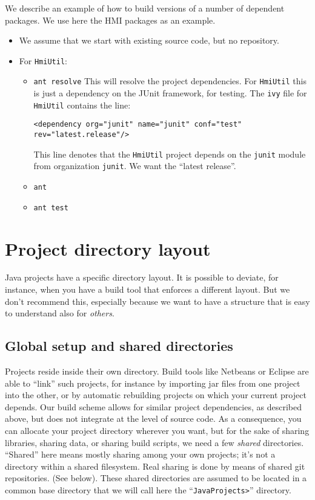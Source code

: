 We describe an example of how to build versions of a number of dependent packages.
We use here the HMI packages as an example.

\begin{itemize}
\item We assume that we start with existing source code, but no repository.

\item For \verb"HmiUtil":
\begin{itemize}
\item \verb"ant resolve"
This will resolve the project dependencies. For \verb"HmiUtil" this is just
a dependency on the JUnit framework, for testing.
The \verb"ivy" file for \verb"HmiUtil"
contains the line:
\begin{verbatim}
<dependency org="junit" name="junit" conf="test" rev="latest.release"/>
\end{verbatim}
This line denotes that the \verb"HmiUtil" project depends on the \verb"junit" module from
organization \verb"junit". We want the ``latest release''.
\item \verb"ant"

\item \verb"ant test"

\end{itemize}

\end{itemize}



\section{Project directory layout}
Java projects have a specific directory layout. It is possible to deviate, for instance, when you have
a build tool that enforces a different layout. But we don't recommend this, especially because we
want to have a structure that is easy to understand also for \emph{others}.

\subsection{Global setup and shared directories}
Projects reside inside their own directory. Build tools like Netbeans or Eclipse are able to ``link'' such projects,
 for instance by importing jar files from one project into the other,
 or by automatic rebuilding projects on which your current project depends.
 Our build scheme allows for similar project dependencies, as described above, but does not integrate at the level of source code. As a consequence, you can allocate your project directory wherever you want, but for the sake of sharing
 libraries, sharing data, or sharing build scripts, we need a few \emph{shared} directories.
 ``Shared'' here means mostly sharing among your own projects; it's not a directory within a shared filesystem.
 Real sharing is done by means of shared git repositories. (See below).
 These shared directories are assumed to be located in a common base directory that we will call here
 the ``\verb"JavaProjects>"'' directory.


